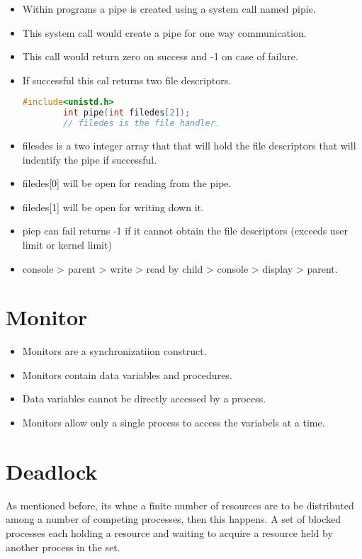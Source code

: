 \documentclass[11pt]{article}
\begin{document}
\begin{itemize}
	\item Within programs a pipe is created using a system call named pipie.
	\item This system call would create a pipe for one way communication. 
	\item This call would return zero on success and -1 on case of failure. 
	\item If successful this cal returns two file descriptors. 
	\begin{lstlisting}[language = C]
		#include<unistd.h>
		int pipe(int filedes[2]);
		// filedes is the file handler. 
	\end{lstlisting}
	\item filesdes is a two integer array that that will hold the file descriptors that will indentify the pipe if successful. 
	\item filedes[0] will be open for reading from the pipe. 
	\item filedes[1] will be open for writing down it. 
	\item piep can fail returns -1 if it cannot obtain the file descriptors (exceeds user limit or kernel limit)
	\item console > parent > write > read by child > console > display > parent.
\end{itemize}

\section{Monitor}
\begin{itemize}
	\item Monitors are a synchronizatiion construct. 
	\item Monitors contain data variables and procedures. 
	\item Data variables cannot be directly accessed by a process. 
	\item Monitors allow only a single process to access the variabels at a time. 
\end{itemize}

\section{Deadlock}
As mentioned before, its whne a finite number of resources are to be distributed among a number of competing processes, then this happens. 
A set of blocked processes each holding a resource and waiting to acquire a resource held by another process in the set. 
\end{document}
